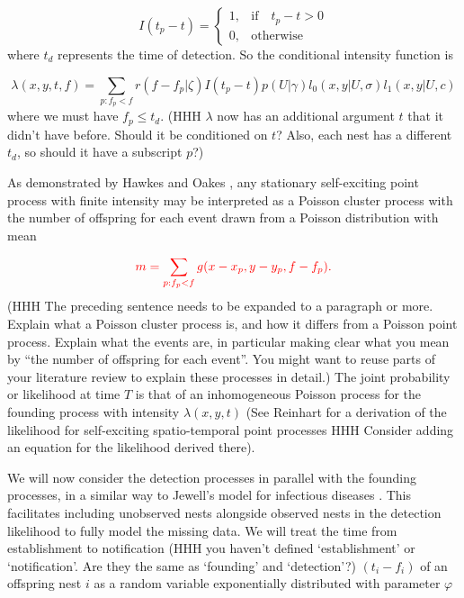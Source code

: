 \documentclass{article}
\begin{document}
\begin{equation*}
    I (t_p - t) =
    \begin{cases}
        1, & \mbox{if} \quad t_p -  t> 0 \\
        0, & \mbox{otherwise}
    \end{cases}
\end{equation*}
where $t_d$ represents the time of detection. So the conditional intensity function is

\begin{equation*}
    \lambda(x, y, t, f) = \sum_{p:f_p < f} r(f - f_p | \zeta) I(t_p - t) p(U | \gamma) l_0(x, y | U, \sigma) l_1(x, y | U, c)
\end{equation*}
where we must have $f_p\leq t_d$. (HHH $\lambda$ now has an additional argument $t$ that it didn't have before. Should it be conditioned on $t$? Also, each nest has a different $t_d$, so should it have a subscript $p$?)

As demonstrated by Hawkes and Oakes \cite{Hawkes74}, any stationary self-exciting point process with finite intensity may be interpreted as a Poisson cluster process with the number of offspring for each event drawn from a Poisson distribution with mean 

\begin{equation} \label{eq:NumOffsp}
    {\color{red} m = \sum_{p:f_p < f} g(x-x_p, y-y_p, f-f_p).}
\end{equation}
(HHH The preceding sentence needs to be expanded to a paragraph or more. Explain what a Poisson cluster process is, and how it differs from a Poisson point process. Explain what the events are, in particular making clear what you mean by ``the number of offspring for each event''. You might want to reuse parts of your literature review to explain these processes in detail.)
The joint probability or likelihood at time $T$ is that of an inhomogeneous Poisson process for the founding process with intensity $\lambda(x, y, t)$ (See Reinhart \cite{Reinhart} for a derivation of the likelihood for self-exciting spatio-temporal point processes HHH Consider adding an equation for the likelihood derived there).

We will now consider the detection processes in parallel with the founding processes, in a similar way to Jewell's model for infectious diseases \cite{Jewell}. This facilitates including unobserved nests alongside observed nests in the detection likelihood to fully model the missing data. We will treat the time from establishment to notification (HHH you haven't defined `establishment' or `notification'. Are they the same as `founding' and `detection'?) $(t_i - f_i)$ of an offspring nest $i$ as a random variable exponentially distributed with parameter $\varphi$
\end{document}
